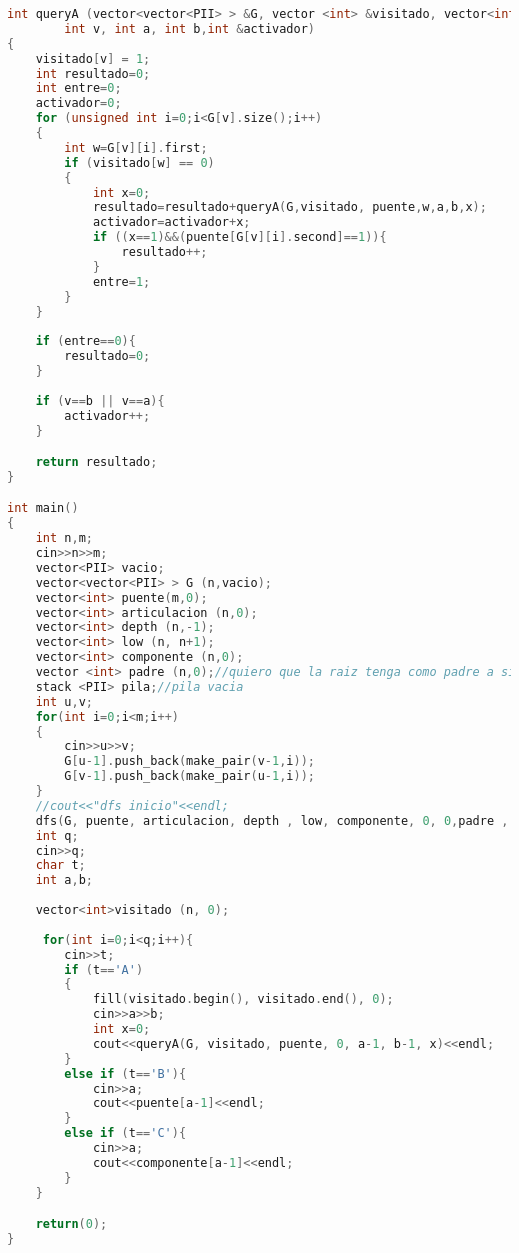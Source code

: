 \documentclass[a4paper]{article}
\begin{document}
\begin{lstlisting}[language=c++]
int queryA (vector<vector<PII> > &G, vector <int> &visitado, vector<int> &puente, 
		int v, int a, int b,int &activador)
{
    visitado[v] = 1;
    int resultado=0;
    int entre=0;
    activador=0;
    for (unsigned int i=0;i<G[v].size();i++)
    {
        int w=G[v][i].first;
        if (visitado[w] == 0)
        {
            int x=0;
            resultado=resultado+queryA(G,visitado, puente,w,a,b,x);
            activador=activador+x;
            if ((x==1)&&(puente[G[v][i].second]==1)){
                resultado++;
            }
            entre=1;
        }
    }
    
    if (entre==0){
        resultado=0;
    }
    
    if (v==b || v==a){
        activador++;
    }

    return resultado;
}

int main()
{
    int n,m;
    cin>>n>>m;
    vector<PII> vacio;
    vector<vector<PII> > G (n,vacio);
    vector<int> puente(m,0);
    vector<int> articulacion (n,0);
    vector<int> depth (n,-1);
    vector<int> low (n, n+1);
    vector<int> componente (n,0);
    vector <int> padre (n,0);//quiero que la raiz tenga como padre a si mismo
    stack <PII> pila;//pila vacia
    int u,v;
    for(int i=0;i<m;i++)
    {
        cin>>u>>v;
        G[u-1].push_back(make_pair(v-1,i));
        G[v-1].push_back(make_pair(u-1,i));
    }
    //cout<<"dfs inicio"<<endl;
    dfs(G, puente, articulacion, depth , low, componente, 0, 0,padre , pila);
    int q;
    cin>>q;
    char t;
    int a,b;
    
    vector<int>visitado (n, 0);
    
     for(int i=0;i<q;i++){
        cin>>t;
        if (t=='A')
        {
            fill(visitado.begin(), visitado.end(), 0);
            cin>>a>>b;
            int x=0;
            cout<<queryA(G, visitado, puente, 0, a-1, b-1, x)<<endl;
        }
        else if (t=='B'){
            cin>>a;
            cout<<puente[a-1]<<endl;
        }
        else if (t=='C'){
            cin>>a;
            cout<<componente[a-1]<<endl;
        }
    }

    return(0);
}


\end{lstlisting}
\newpage
\end{document}

